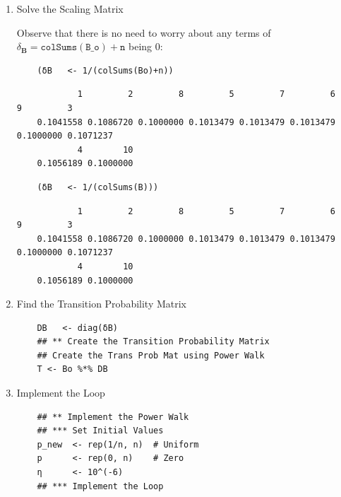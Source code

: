 \documentclass[11pt, twoside]{report}
\begin{document}
\begin{enumerate}
\item Solve the Scaling Matrix
\label{sec:org91a6dae}

Observe that there is no need to worry about any terms of \(\delta_{\mathbf{B}} = \mathtt{colSums\left(B\_o\right)+n}\) being 0:

\begin{tcolorbox}
    \begin{verbatim}
    (δB   <- 1/(colSums(Bo)+n))
    \end{verbatim}
\tcblower
    \begin{verbatim}
            1         2         8         5         7         6         9         3
    0.1041558 0.1086720 0.1000000 0.1013479 0.1013479 0.1013479 0.1000000 0.1071237
            4        10
    0.1056189 0.1000000
    \end{verbatim}
\end{tcolorbox}

\begin{tcolorbox}
    \begin{verbatim}
    (δB   <- 1/(colSums(B)))
    \end{verbatim}
\tcblower
    \begin{verbatim}
            1         2         8         5         7         6         9         3
    0.1041558 0.1086720 0.1000000 0.1013479 0.1013479 0.1013479 0.1000000 0.1071237
            4        10
    0.1056189 0.1000000
    \end{verbatim}
\end{tcolorbox}

\item Find the Transition Probability Matrix
\label{sec:org066ab51}

\begin{tcolorbox}
    \begin{verbatim}
    DB   <- diag(δB)
    ## ** Create the Transition Probability Matrix
    ## Create the Trans Prob Mat using Power Walk
    T <- Bo %*% DB
    \end{verbatim}
\end{tcolorbox}
\newpage
\item Implement the Loop
\label{sec:orgbb34a45}

\begin{tcolorbox}
    \begin{verbatim}
    ## ** Implement the Power Walk
    ## *** Set Initial Values
    p_new  <- rep(1/n, n)  # Uniform
    p      <- rep(0, n)    # Zero
    η      <- 10^(-6)
    ## *** Implement the Loop


\end{verbatim}
\end{tcolorbox}
\end{enumerate}
\end{document}
